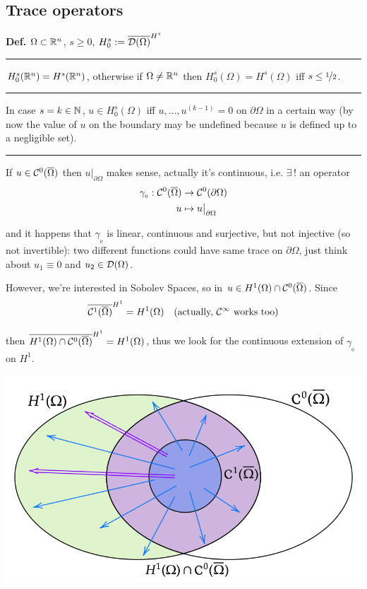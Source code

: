 \newpage


\subsection{\color{red}Trace operators}


\textbf{Def.} $\Omega\subset \mathbb{R}^n$, $s\geq 0$, $H_0^s:=\overline{\mathcal{D}(\Omega)}^{H^s}$

\rule{0.31\textwidth}{0.2pt}
\smallskip

$H_0^s(\mathbb{R}^n)=H^s(\mathbb{R}^n)$, otherwise if $\Omega\neq\mathbb{R}^n$ then $H_0^s(\Omega)=H^s(\Omega)$ iff $s\leq\nicefrac{1}{2}$.

\rule{0.31\textwidth}{0.2pt}
\smallskip

In case $s=k\in\mathbb{N}$, $u\in H^s_0(\Omega)$ iff $u,\dots,u^{(k-1)}=0$ on $\partial\Omega$ in a certain way (by now the value of $u$ on the boundary may be undefined because $u$ is defined up to a negligible set).

\rule{0.31\textwidth}{0.2pt}
\smallskip

If $u\in\mathcal{C}^0(\overline{\Omega})$ then $u\big|_{\partial\Omega}$ makes sense, actually it's continuous, i.e. $\exists \,!$ an operator
\begin{align*}
\gamma_{_0}:\mathcal{C}^0(\overline{\Omega})&\to\mathcal{C}^0(\partial\Omega) \\
u&\mapsto u\big|_{\partial\Omega}
\end{align*}

and it happens that $\gamma_{_0}$ is linear, continuous and surjective, but not injective (so not invertible): two different functions could have same trace on $\partial\Omega$, just think about $u_1\equiv0$ and $u_2\in\mathcal{D}(\Omega)$.

\smallskip

However, we're interested in Sobolev Spaces, so in $u\in H^1(\Omega)\cap \mathcal{C}^0(\overline{\Omega})$. Since
\begin{equation*}
\overline{\mathcal{C}^1(\overline{\Omega})}^{H^1}=H^1(\Omega) \quad(\text{actually, }\mathcal{C}^\infty\text{ works too})
\end{equation*}

then $\overline{H^1(\Omega)\cap\mathcal{C}^0(\overline{\Omega})}^{H^1}=H^1(\Omega)$, thus we look for the continuous extension of $\gamma_{_0}$ on $H^1$. 

\begin{Figure}
    \centering
    \includegraphics[width=0.8\linewidth]{images/density}
\end{Figure}

